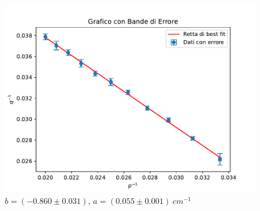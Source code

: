\begin{figure}[H]
	\centering
	\includegraphics[width=1\textwidth]{./grafico1.pdf}
	\caption{$b=(-0.860\pm 0.031)$, 
			 $a=(0.055\pm 0.001)\ cm^{-1}$}
\end{figure}
